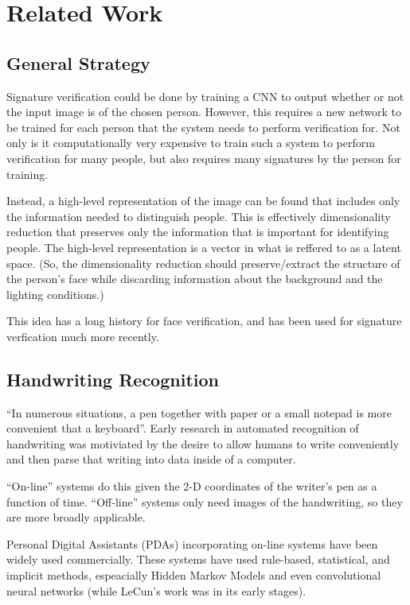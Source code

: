 \section{Related Work}\label{sec:related_work}

\subsection{General Strategy}
Signature verification could be done by training a CNN to output whether or not the input image is of the chosen person.
However, this requires a new network to be trained for each person that the system needs to perform verification for.
Not only is it computationally very expensive to train such a system to perform verification for many people, but also requires many signatures by the person for training.

Instead, a high-level representation of the image can be found that includes only the information needed to distinguish people.
This is effectively dimensionality reduction that preserves only the information that is important for identifying people.
The high-level representation is a vector in what is reffered to as a latent space.
(So, the dimensionality reduction should preserve/extract the structure of the person's face while discarding information about the background and the lighting conditions.)

This idea has a long history for face verification\cite{LeCun}, and has been used for signature verfication much more recently\cite{sig_net}.

\subsection{Handwriting Recognition} %
``In numerous situations, a pen together with paper or a small notepad is more convenient that a keyboard''\cite{handwriting_survey}.
Early research in automated recognition of handwriting was motiviated by the desire to allow humans to write conveniently and then parse that writing into data inside of a computer.

``On-line'' systems do this given the 2-D coordinates of the writer's pen as a function of time.%
``Off-line'' systems only need images of the handwriting, so they are more broadly applicable\cite{handwriting_survey}.

Personal Digital Assistants (PDAs) incorporating on-line systems have been widely used commercially.
These systems have used rule-based, statistical, and implicit methods\cite{handwriting_survey}, espeacially Hidden Markov Models and even convolutional neural networks\cite{389575} (while LeCun's work was in its early stages\cite{mnist}).

